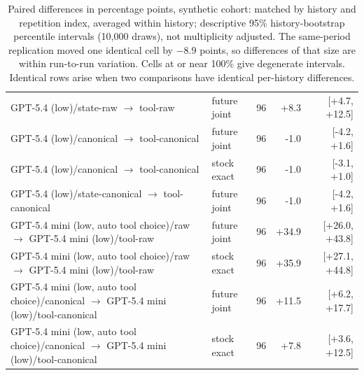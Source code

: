 \begin{table}[htbp]
{\begin{tabular}{lllrr}
GPT-5.4 (low)/state-raw $\to$ tool-raw & future joint & 96 & +8.3 & [+4.7, +12.5] \\
GPT-5.4 (low)/canonical $\to$ tool-canonical & future joint & 96 & -1.0 & [-4.2, +1.6] \\
GPT-5.4 (low)/canonical $\to$ tool-canonical & stock exact & 96 & -1.0 & [-3.1, +1.0] \\
GPT-5.4 (low)/state-canonical $\to$ tool-canonical & future joint & 96 & -1.0 & [-4.2, +1.6] \\
GPT-5.4 mini (low, auto tool choice)/raw $\to$ GPT-5.4 mini (low)/tool-raw & future joint & 96 & +34.9 & [+26.0, +43.8] \\
GPT-5.4 mini (low, auto tool choice)/raw $\to$ GPT-5.4 mini (low)/tool-raw & stock exact & 96 & +35.9 & [+27.1, +44.8] \\
GPT-5.4 mini (low, auto tool choice)/canonical $\to$ GPT-5.4 mini (low)/tool-canonical & future joint & 96 & +11.5 & [+6.2, +17.7] \\
GPT-5.4 mini (low, auto tool choice)/canonical $\to$ GPT-5.4 mini (low)/tool-canonical & stock exact & 96 & +7.8 & [+3.6, +12.5] \\
\bottomrule
\end{tabular}}
\caption{Paired differences in percentage points, synthetic cohort: matched by history and repetition index, averaged within history; descriptive 95\% history-bootstrap percentile intervals (10,000 draws), not multiplicity adjusted. The same-period replication moved one identical cell by $-8.9$ points, so differences of that size are within run-to-run variation. Cells at or near 100\% give degenerate intervals. Identical rows arise when two comparisons have identical per-history differences.}
\label{tab:extpaired_heldout}
\end{table}

